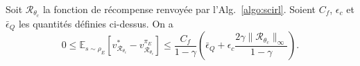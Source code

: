\documentclass[english,utf8]{./hermes-journal}
\newcommand{\R}{\mathcal{R}}
\newcommand{\E}{\mathbb{E}}
\begin{document}
\begin{theorem}
  \label{th}
  Soit $\R_{\theta_c}$ la fonction de récompense renvoyée par l'Alg.~\ref{algo:scirl}. Soient $C_f$, $\epsilon_c$
  et $\bar{\epsilon}_Q$ les quantités définies ci-dessus. On a
  \begin{equation}
    0\leq
    \E_{s\sim\rho_E}[v^*_{\R_{\theta_c}}-v^{\pi_E}_{\R_{\theta_c}}]
    \leq \frac{C_f}{1-\gamma}\left(\bar{\epsilon}_Q +
    \epsilon_c\frac{2\gamma\|\R_{\theta_c}\|_\infty}{1-\gamma}
    \right).
  \end{equation}
\end{theorem}
\end{document}
